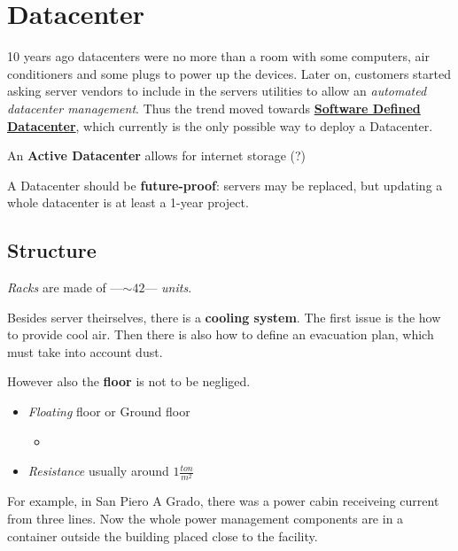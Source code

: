 \chapter{Datacenter}
10 years ago datacenters were no more than a room with some computers, air conditioners and some plugs to power up the devices.
Later on, customers started asking server vendors to include in the servers utilities to allow an \textit{automated datacenter management}.
Thus the trend moved towards \textbf{\ul{Software Defined Datacenter}}, which currently is the only possible way to deploy a Datacenter.

An \textbf{Active Datacenter} allows for internet storage (?)

A Datacenter should be \textbf{future-proof}: servers may be replaced, but updating a whole datacenter is at least a 1-year project.

\section{Structure}
\textit{Racks} are made of ---$\sim 42$--- \textit{units}.

Besides server theirselves, there is a \textbf{cooling system}.
The first issue is the how to provide cool air. Then there is also how to define an evacuation plan, which must take into account dust.

However also the \textbf{floor} is not to be negliged.
\begin{itemize}
   \item \textit{Floating} floor or Ground floor
   \begin{itemize}
      \item 
   \end{itemize}
   \item \textit{Resistance} usually around $1 \frac{ton}{m^2}$  
\end{itemize}

For example, in San Piero A Grado, there was a power cabin receiveing current from three lines.
Now the whole power management components are in a container outside the building placed close to the facility.

